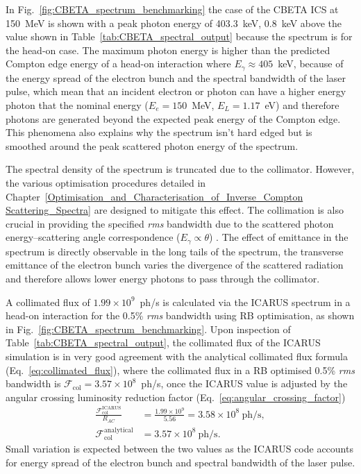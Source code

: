 \documentclass[../main.tex]{subfiles}
\begin{document}
In Fig.~\ref{fig:CBETA_spectrum_benchmarking} the case of the CBETA ICS at 150~\si{\mega\electronvolt} is shown with a peak photon energy of 403.3~\si{\kilo\electronvolt}, 0.8~\si{\kilo\electronvolt} above the value shown in Table~\ref{tab:CBETA_spectral_output} because the spectrum is for the head-on case. The maximum photon energy is higher than the predicted Compton edge energy of a head-on interaction where $E_{\gamma}\approx405$~\si{\kilo\electronvolt}, because of the energy spread of the electron bunch and the spectral bandwidth of the laser pulse, which mean that an incident electron or photon can have a higher energy photon that the nominal energy ($E_{e} = 150$~\si{\mega\electronvolt}, $E_{L} = 1.17$~\si{\electronvolt}) and therefore photons are generated beyond the expected peak energy of the Compton edge. This phenomena also explains why the spectrum isn't hard edged but is smoothed around the peak scattered photon energy of the spectrum. 

The spectral density of the spectrum is truncated due to the collimator. However, the various optimisation procedures detailed in Chapter~\ref{Optimisation_and_Characterisation_of_Inverse_Compton Scattering_Spectra} are designed to mitigate this effect. The collimation is also crucial in providing the specified \textit{rms} bandwidth due to the scattered photon energy--scattering angle correspondence ($E_{\gamma}\propto\theta$) . The effect of emittance in the spectrum is directly observable in the long tails of the spectrum, the transverse emittance of the electron bunch varies the divergence of the scattered radiation and therefore allows lower energy photons to pass through the collimator. 

A collimated flux of $1.99\times 10^{9}$~ph/\si{\second} is calculated via the \textsc{ICARUS} spectrum in a head-on interaction for the 0.5\% \textit{rms} bandwidth using RB optimisation, as shown in Fig.~\ref{fig:CBETA_spectrum_benchmarking}. Upon inspection of Table~\ref{tab:CBETA_spectral_output}, the collimated flux of the \textsc{ICARUS} simulation is in very good agreement with the analytical collimated flux formula (Eq.~\ref{eq:collimated_flux}), where the collimated flux in a RB optimised 0.5\% \textit{rms} bandwidth is $\mathcal{F}_{\mathrm{col}} = 3.57\times 10^{8}$~ph/\si{\second}, once the \textsc{ICARUS} value is adjusted by the angular crossing luminosity reduction factor (Eq.~\ref{eq:angular_crossing_factor})
\begin{align*}
\frac{\mathcal{F}_{\mathrm{col}}^{\mathrm{ICARUS}}}{R_{AC}} &= \frac{1.99\times 10^{9}}{5.56} = 3.58\times 10^{8}~\mathrm{ph/\si{\second}}, \\
\mathcal{F}_{\mathrm{col}}^{\mathrm{analytical}} &= 3.57\times 10^{8}~\mathrm{ph/\si{\second}}.
\label{eq:CBETA_ICARUS_yield}    
\end{align*}
Small variation is expected between the two values as the ICARUS code accounts for energy spread of the electron bunch and spectral bandwidth of the laser pulse.
\end{document}
